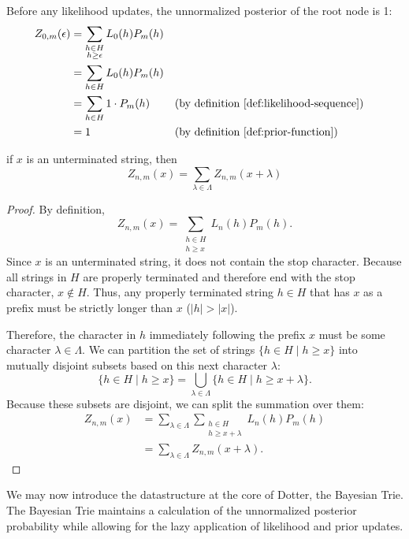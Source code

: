 \begin{proposition}
    Before any likelihood updates, the unnormalized posterior of the root node is 1:
    \begin{align*}
        Z_{0,m}(\epsilon) &= \sum_{\substack{h \in H \\ h \geq \epsilon}} L_0(h) P_m(h) \notag \\
        &= \sum_{h \in H} L_0(h) P_m(h) \notag \\
        &= \sum_{h \in H} 1 \cdot P_m(h) && \text{(by definition \ref{def:likelihood-sequence})} \\
        &= 1 && \text{(by definition \ref{def:prior-function})} \notag
    \end{align*}
\end{proposition}

\begin{lemma}
\label{lemma:posterior-equals-sum-of-children}
    if $x$ is an unterminated string, then
    $$
    Z_{n,m}(x) = \sum_{\lambda \in \Lambda} Z_{n,m}(x+\lambda)
    $$
\end{lemma}
\begin{proof}
    By definition,
    $$
    Z_{n,m}(x) = \sum_{\substack{h \in H \\ h \geq x}} L_n(h) P_m(h).
    $$
    Since $x$ is an unterminated string, it does not contain the stop character. Because all strings in $H$ are properly terminated and therefore end with the stop character, $x \notin H$. Thus, any properly terminated string $h \in H$ that has $x$ as a prefix must be strictly longer than $x$ ($|h| > |x|$).

    Therefore, the character in $h$ immediately following the prefix $x$ must be some character $\lambda \in \Lambda$. We can partition the set of strings $\{h \in H \mid h \geq x\}$ into mutually disjoint subsets based on this next character $\lambda$:
    $$
    \{h \in H \mid h \geq x\} = \bigcup_{\lambda \in \Lambda} \{h \in H \mid h \geq x+\lambda\}.
    $$
    Because these subsets are disjoint, we can split the summation over them:
    \begin{align*}
        Z_{n,m}(x) &= \sum_{\lambda \in \Lambda} \sum_{\substack{h \in H \\ h \geq x+\lambda}} L_n(h) P_m(h) \\
        &= \sum_{\lambda \in \Lambda} Z_{n,m}(x+\lambda).
    \end{align*}
\end{proof}

We may now introduce the datastructure at the core of Dotter, the Bayesian Trie.
The Bayesian Trie maintains a calculation of the unnormalized posterior probability
while allowing for the lazy application of likelihood and prior updates.

